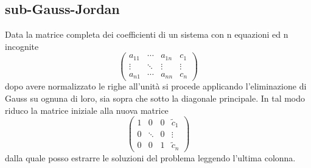 \documentclass{article}
\numberwithin{equation}{subsection}
\begin{document}
\subsection{sub-Gauss-Jordan} \label{subsec:gauss}
\vspace{0.2 cm}
Data la matrice completa dei coefficienti di un sistema con n equazioni ed n incognite
\begin{equation}\label{eq:gauss-jordan}
    \begin{pmatrix}
        a_{11}  &  \cdots  &  a_{1n}  &  c_1    \\
        \vdots  &  \ddots  &  \vdots  &  \vdots \\
        a_{n1}  &  \cdots  &  a_{nn}  &  c_n    
    \end{pmatrix}
\end{equation}
dopo avere normalizzato le righe all'unità si procede applicando l'eliminazione di Gauss su ognuna di loro, sia sopra che sotto la diagonale principale. In tal modo riduco la matrice iniziale alla nuova matrice
\begin{equation}
    \begin{pmatrix}
        1  &    0   &  0  &  \tilde{c}_1 \\
        0  & \ddots &  0  &  \vdots      \\
        0  &    0   &  1  &  \tilde{c}_n
    \end{pmatrix}
\end{equation}
dalla quale posso estrarre le soluzioni del problema leggendo l'ultima colonna.
\end{document}
